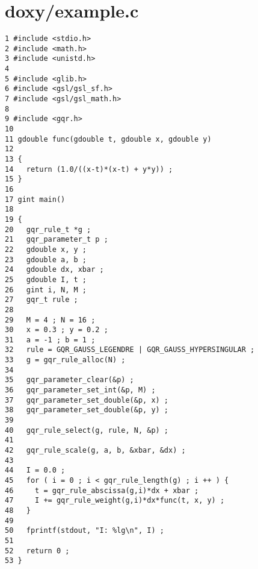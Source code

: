 \section{doxy/example.c}


\begin{DocInclude}\begin{verbatim}1 #include <stdio.h>
2 #include <math.h>
3 #include <unistd.h>
4 
5 #include <glib.h>
6 #include <gsl/gsl_sf.h>
7 #include <gsl/gsl_math.h>
8 
9 #include <gqr.h>
10 
11 gdouble func(gdouble t, gdouble x, gdouble y)
12 
13 {
14   return (1.0/((x-t)*(x-t) + y*y)) ;
15 }
16 
17 gint main()
18 
19 {
20   gqr_rule_t *g ;
21   gqr_parameter_t p ;
22   gdouble x, y ;
23   gdouble a, b ;
24   gdouble dx, xbar ;
25   gdouble I, t ;
26   gint i, N, M ;
27   gqr_t rule ;
28 
29   M = 4 ; N = 16 ; 
30   x = 0.3 ; y = 0.2 ;
31   a = -1 ; b = 1 ;
32   rule = GQR_GAUSS_LEGENDRE | GQR_GAUSS_HYPERSINGULAR ;
33   g = gqr_rule_alloc(N) ;
34 
35   gqr_parameter_clear(&p) ;
36   gqr_parameter_set_int(&p, M) ;
37   gqr_parameter_set_double(&p, x) ;
38   gqr_parameter_set_double(&p, y) ;
39 
40   gqr_rule_select(g, rule, N, &p) ;
41 
42   gqr_rule_scale(g, a, b, &xbar, &dx) ;
43 
44   I = 0.0 ;
45   for ( i = 0 ; i < gqr_rule_length(g) ; i ++ ) {
46     t = gqr_rule_abscissa(g,i)*dx + xbar ;
47     I += gqr_rule_weight(g,i)*dx*func(t, x, y) ;
48   }
49 
50   fprintf(stdout, "I: %lg\n", I) ;
51 
52   return 0 ;
53 }
\end{verbatim}
\end{DocInclude}
 